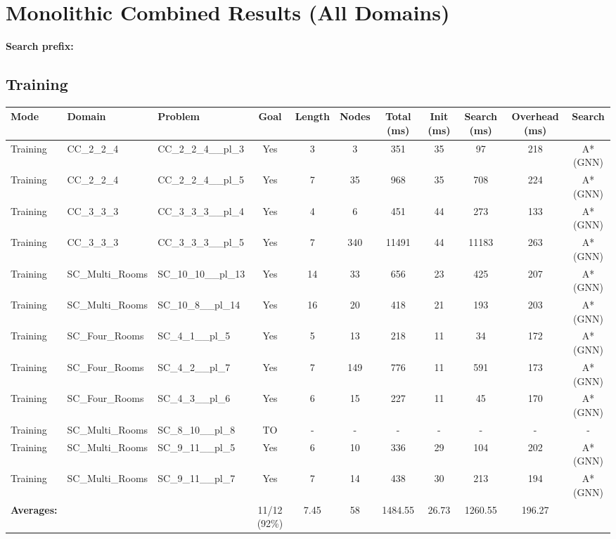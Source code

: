 \documentclass{article}
\begin{document}
\section*{Monolithic Combined Results (All Domains)}
\textbf{Search prefix:} 
\\[0.5cm]
\subsection*{Training}
\begin{tabular}{lllcccccccc}
\toprule
Mode & Domain & Problem & Goal & Length & Nodes & Total (ms) & Init (ms) & Search (ms) & Overhead (ms) & Search \\
\midrule
Training & CC\_2\_2\_4 & CC\_2\_2\_4\_\_pl\_3 & Yes & 3 & 3 & 351 & 35 & 97 & 218 & A*(GNN) \\
Training & CC\_2\_2\_4 & CC\_2\_2\_4\_\_pl\_5 & Yes & 7 & 35 & 968 & 35 & 708 & 224 & A*(GNN) \\
Training & CC\_3\_3\_3 & CC\_3\_3\_3\_\_pl\_4 & Yes & 4 & 6 & 451 & 44 & 273 & 133 & A*(GNN) \\
Training & CC\_3\_3\_3 & CC\_3\_3\_3\_\_pl\_5 & Yes & 7 & 340 & 11491 & 44 & 11183 & 263 & A*(GNN) \\
Training & SC\_Multi\_Rooms & SC\_10\_10\_\_pl\_13 & Yes & 14 & 33 & 656 & 23 & 425 & 207 & A*(GNN) \\
Training & SC\_Multi\_Rooms & SC\_10\_8\_\_pl\_14 & Yes & 16 & 20 & 418 & 21 & 193 & 203 & A*(GNN) \\
Training & SC\_Four\_Rooms & SC\_4\_1\_\_pl\_5 & Yes & 5 & 13 & 218 & 11 & 34 & 172 & A*(GNN) \\
Training & SC\_Four\_Rooms & SC\_4\_2\_\_pl\_7 & Yes & 7 & 149 & 776 & 11 & 591 & 173 & A*(GNN) \\
Training & SC\_Four\_Rooms & SC\_4\_3\_\_pl\_6 & Yes & 6 & 15 & 227 & 11 & 45 & 170 & A*(GNN) \\
Training & SC\_Multi\_Rooms & SC\_8\_10\_\_pl\_8 & TO & - & - & - & - & - & - & - \\
Training & SC\_Multi\_Rooms & SC\_9\_11\_\_pl\_5 & Yes & 6 & 10 & 336 & 29 & 104 & 202 & A*(GNN) \\
Training & SC\_Multi\_Rooms & SC\_9\_11\_\_pl\_7 & Yes & 7 & 14 & 438 & 30 & 213 & 194 & A*(GNN) \\
\textbf{Averages:} & & & 11/12 (92\%) & 7.45 & 58 & 1484.55 & 26.73 & 1260.55 & 196.27 & \\
\bottomrule
\end{tabular}
\newpage
\end{document}
